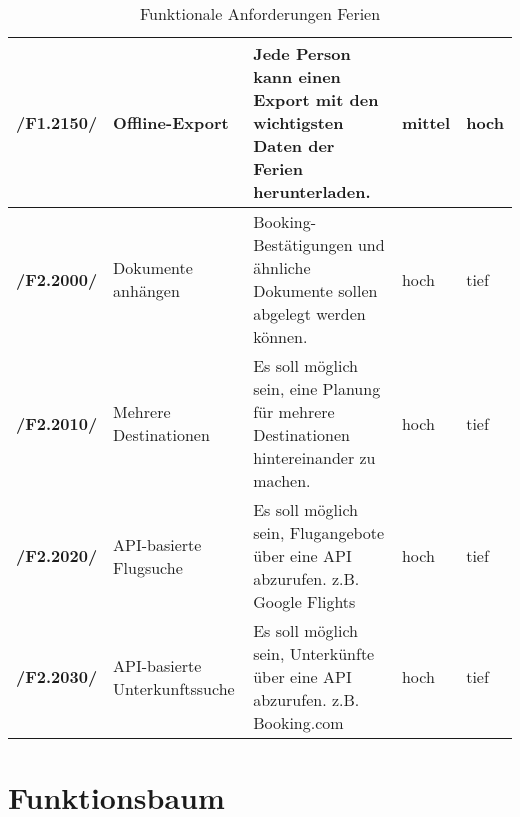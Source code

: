 \documentclass[10pt,a4paper,titlepage,twoside,german]{zhawreprt}
\newcommand{\AddRequirement}[2]{
\textbf{/#1#2/}
}
\newcommand{\F}[1]{
\AddRequirement{F1.}{#1}
}
\newcommand{\W}[1]{
\AddRequirement{F2.}{#1}
}
\begin{document}
\begin{table}[ht]
\begin{tabular}{l|p{2.5cm}|p{5cm}|p{2cm}|p{1.5cm}}
\F{2150} & Offline-Export & Jede Person kann einen Export mit den wichtigsten Daten der Ferien herunterladen. & mittel & hoch\\\hline
\W{2000} & Dokumente anhängen & Booking-Bestätigungen und ähnliche Dokumente sollen abgelegt werden können. & hoch & tief\\\hline
\W{2010} & Mehrere Destinationen & Es soll möglich sein, eine Planung für mehrere Destinationen hintereinander zu machen. & hoch & tief\\\hline
\W{2020} & API-basierte Flugsuche & Es soll möglich sein, Flugangebote über eine API abzurufen. z.B. Google Flights & hoch & tief\\\hline
\W{2030} & API-basierte Unterkunftssuche & Es soll möglich sein, Unterkünfte über eine API abzurufen. z.B. Booking.com & hoch & tief\\\hline
\end{tabular}
\caption{Funktionale Anforderungen Ferien}\label{tbl:FuncVacation}
\end{table}\newpage

\chapter{Funktionsbaum}\label{chp:FunctionTree}
\begin{minipage}{\textwidth}

\end{minipage}
\end{document}
